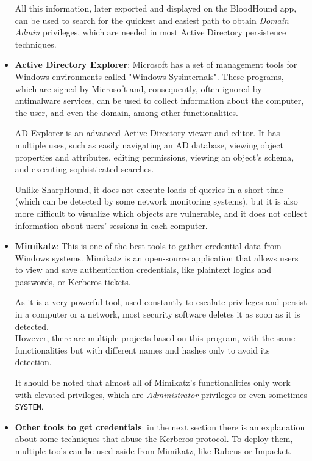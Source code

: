 \begin{itemize}
All this information, later exported and displayed on the BloodHound app, can be used to search for the quickest and easiest path to obtain \textit{Domain Admin} privileges, which are needed in most Active Directory persistence techniques.

\item \textbf{Active Directory Explorer}: Microsoft has a set of management tools for Windows environments called "Windows Sysinternals". These programs, which are signed by Microsoft and, consequently, often ignored by antimalware services, can be used to collect information about the computer, the user, and even the domain, among other functionalities.

AD Explorer\cite{ADExplorer} is an advanced Active Directory viewer and editor.  It has multiple uses, such as easily navigating an AD database, viewing object properties and attributes, editing permissions, viewing an object's schema, and executing sophisticated searches. 

Unlike SharpHound, it does not execute loads of queries in a short time (which can be detected by some network monitoring systems), but it is also more difficult to visualize which objects are vulnerable, and it does not collect information about users' sessions in each computer.

\item \textbf{Mimikatz}: This is one of the best tools to gather credential data from Windows systems. Mimikatz\cite{Mimikatz} is an open-source application that allows users to view and save authentication credentials, like plaintext logins and passwords, or Kerberos tickets.  

As it is a very powerful tool, used constantly to escalate privileges and persist in a computer or a network, most security software deletes it as soon as it is detected.\\ However, there are multiple projects based on this program, with the same functionalities but with different names and hashes only to avoid its detection.

It should be noted that almost all of Mimikatz's functionalities \underline{only work with elevated privileges}, which are \textit{Administrator} privileges or even sometimes \texttt{SYSTEM}. 
   
\item \textbf{Other tools to get credentials}: in the next section there is an explanation about some techniques that abuse the Kerberos protocol. To deploy them, multiple tools can be used aside from Mimikatz, like Rubeus or Impacket. 


\end{itemize}
